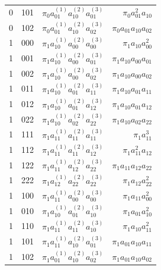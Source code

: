 \documentclass[11pt, a4paper]{article}
\numberwithin{equation}{section}
\theoremstyle{plain}
\theoremstyle{definition}
\begin{document}
{\begin{table}[!ht]
\begin{tabular}{c|c|c|r}
        0 & 101  & $\pi_0a_{01}^{(1)} a_{10}^{(2)} a_{01}^{(3)}$ & $\pi_0a_{01}^2 a_{10}$ \\ 
        0 & 102 & $\pi_0a_{01}^{(1)} a_{10}^{(2)} a_{02}^{(3)}$ & $\pi_0a_{01}a_{10}a_{02}$ \\  
        \hline
        1 & 000 & $\pi_1a_{10}^{(1)} a_{00}^{(2)} a_{00}^{(3)}$ & $\pi_1a_{10} a_{00}^2$ \\
        1 & 001  & $\pi_1a_{10}^{(1)} a_{00}^{(2)} a_{01}^{(3)}$ & $\pi_1a_{10} a_{00} a_{01}$ \\
        1 & 002  & $\pi_1a_{10}^{(1)} a_{00}^{(2)} a_{02}^{(3)}$ & $\pi_1a_{10} a_{00} a_{02}$ \\
        1 & 011  & $\pi_1a_{10}^{(1)} a_{01}^{(2)} a_{11}^{(3)}$ & $\pi_1a_{10} a_{01} a_{11}$ \\
        1 & 012  & $\pi_1a_{10}^{(1)} a_{01}^{(2)} a_{12}^{(3)}$ & $\pi_1a_{10} a_{01} a_{12}$ \\
        1 & 022  & $\pi_1a_{10}^{(1)} a_{02}^{(2)} a_{22}^{(3)}$ & $\pi_1a_{10} a_{02} a_{22}$ \\
        1 & 111  & $\pi_1a_{11}^{(1)} a_{11}^{(2)} a_{11}^{(3)}$ & $\pi_1a_{11}^3$ \\
        1 & 112  & $\pi_1a_{11}^{(1)} a_{11}^{(2)} a_{12}^{(3)}$ & $\pi_1a_{11}^2 a_{12}$ \\
        1 & 122  & $\pi_1a_{11}^{(1)} a_{12}^{(2)} a_{22}^{(3)}$ & $\pi_1a_{11} a_{12} a_{22}$\\
        1 & 222  & $\pi_1a_{12}^{(1)} a_{22}^{(2)} a_{22}^{(3)}$ & $\pi_1a_{12} a_{22}^2$\\
        1 & 100  & $\pi_1a_{11}^{(1)} a_{00}^{(2)} a_{00}^{(3)}$ & $\pi_1a_{11} a_{00}^2$ \\
        1 & 010  & $\pi_1a_{10}^{(1)} a_{01}^{(2)} a_{10}^{(3)}$ & $\pi_1a_{01} a_{10}^2$ \\
        1 & 110  & $\pi_1a_{11}^{(1)} a_{11}^{(2)} a_{10}^{(3)}$ & $\pi_1a_{10} a_{11}^2$ \\        
        1 & 101  & $\pi_1a_{11}^{(1)} a_{10}^{(2)} a_{01}^{(3)}$ & $\pi_1a_{01} a_{10} a_{11}$ \\           1 & 102 & $\pi_1a_{01}^{(1)} a_{10}^{(2)} a_{02}^{(3)}$ & $\pi_1a_{01}a_{10}a_{02}$ \\     
        \hline        
    \end{tabular}
\end{table}
}

\clearpage
\end{document}
